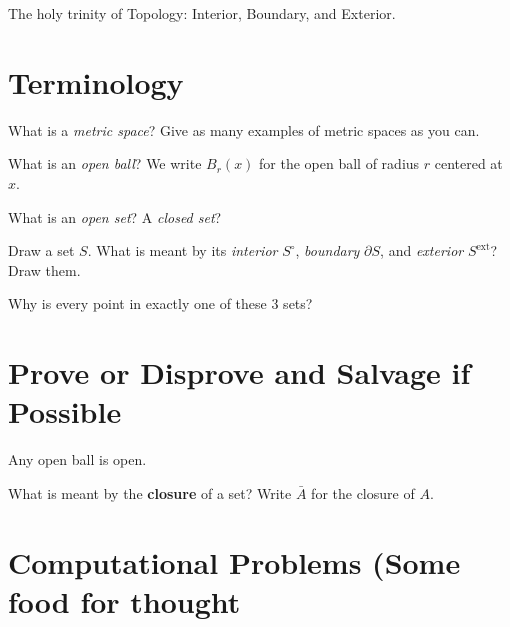 \documentclass{homework}
\author{Names of Contributors}
\begin{document}
\maketitle

\begin{inspiration}
  The holy trinity of Topology: Interior, Boundary, and Exterior.
\end{inspiration}

\section{Terminology}

\begin{problem}
  What is a \textit{metric space}? Give as many examples of metric spaces as you can.
  \label{metric-space}
\end{problem}

\begin{problem}
  What is an \textit{open ball}? We write $B_r(x)$ for the open ball of radius $r$ centered at $x$.
\end{problem}

\begin{problem}
   What is an \textit{open set}? A \textit{closed set}?
\end{problem}

\begin{problem}
  Draw a set $S$. What is meant by its \textit{interior} $S^\circ$, \textit{boundary} $\partial S$, and \textit{exterior} $S^{\text{ext}}$? Draw them.

  Why is every point in exactly one of these 3 sets?
\end{problem}

\section{Prove or Disprove and Salvage if Possible}

\begin{problem}
  Any open ball is open.
\end{problem}

\begin{problem}
  
  What is meant by the \textbf{closure} of a set?  Write $\bar{A}$ for the closure of $A$.
\end{problem}

\section{Computational Problems (Some food for thought}
\end{document}
